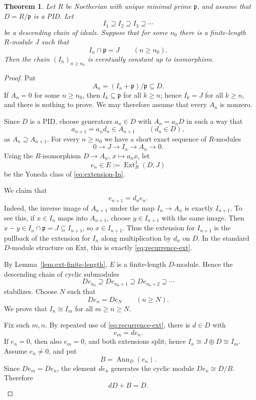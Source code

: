 \documentclass[11pt]{article}
\newtheorem{theorem}{Theorem}[section]
\theoremstyle{definition}
\newcommand{\Ann}{\operatorname{Ann}}
\newcommand{\Ext}{\operatorname{Ext}}
\begin{document}
\begin{theorem}\label{thm:extension-stabilization}
Let $R$ be Noetherian with unique minimal prime $\mathfrak p$, and assume that
$D=R/\mathfrak p$ is a PID.  Let
\[
 I_1\supseteq I_2\supseteq I_3\supseteq\cdots
\]
be a descending chain of ideals.  Suppose that for some $n_0$ there is a finite-length
$R$-module $J$ such that
\[
 I_n\cap\mathfrak p=J\qquad(n\ge n_0).
\]
Then the chain $(I_n)_{n\ge n_0}$ is eventually constant up to isomorphism.
\end{theorem}

\begin{proof}
Put
\[
 A_n=(I_n+\mathfrak p)/\mathfrak p\subseteq D.
\]
If $A_n=0$ for some $n\ge n_0$, then $I_k\subseteq\mathfrak p$ for all $k\ge n$; hence
$I_k=J$ for all $k\ge n$, and there is nothing to prove.  We may therefore assume that every
$A_n$ is nonzero.

Since $D$ is a PID, choose generators $a_n\in D$ with $A_n=a_nD$ in such a way that
\[
 a_{n+1}=a_nd_n\in A_{n+1}\qquad(d_n\in D),
\]
as $A_n\supseteq A_{n+1}.$
For every $n\ge n_0$ we have a short exact sequence of $R$-modules
\begin{equation}\label{eq:extension-In}
 0\longrightarrow J\longrightarrow I_n\longrightarrow A_n\longrightarrow0.
\end{equation}
Using the $R$-isomorphism $D\to A_n$, $x\mapsto a_nx$, let
\[
 e_n\in E:=\Ext^1_R(D,J)
\]
be the Yoneda class of \eqref{eq:extension-In}.

We claim that
\begin{equation}\label{eq:recurrence-ext}
 e_{n+1}=d_ne_n.
\end{equation}
Indeed, the inverse image of $A_{n+1}$ under the map $I_n\to A_n$ is exactly $I_{n+1}$.
To see this, if $x\in I_n$ maps into $A_{n+1}$, choose $y\in I_{n+1}$ with the same image.
Then $x-y\in I_n\cap\mathfrak p=J\subseteq I_{n+1}$, so $x\in I_{n+1}$.  Thus the
extension for $I_{n+1}$ is the pullback of the extension for $I_n$ along multiplication by
$d_n$ on $D$.  In the standard $D$-module structure on Ext, this is exactly
\eqref{eq:recurrence-ext}.

By Lemma~\ref{lem:ext-finite-length}, $E$ is a finite-length $D$-module.  Hence the descending
chain of cyclic submodules
\[
 De_{n_0}\supseteq De_{n_0+1}\supseteq De_{n_0+2}\supseteq\cdots
\]
stabilizes.  Choose $N$ such that
\[
 De_n=De_N\qquad(n\ge N).
\]
We prove that $I_n\cong I_m$ for all $m\ge n\ge N$.

Fix such $m,n$.  By repeated use of \eqref{eq:recurrence-ext}, there is $d\in D$ with
\[
 e_m=de_n.
\]
If $e_n=0$, then also $e_m=0$, and both extensions split; hence
$I_n\cong J\oplus D\cong I_m$.  Assume $e_n\ne0$, and put
\[
 B=\Ann_D(e_n).
\]
Since $De_m=De_n$, the element $de_n$ generates the cyclic module $De_n\cong D/B$.
Therefore
\begin{equation}\label{eq:d-unit-mod-B}
 dD+B=D.
\end{equation}


\end{proof}
\end{document}
